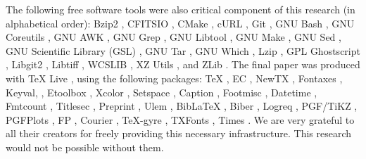 \documentclass[10pt, twocolumn]{article}
\begin{document}
The following free software tools were also critical component of this
research (in alphabetical order): Bzip2 \bziptwoversion, CFITSIO
\cfitsioversion, CMake \cmakeversion, cURL \curlversion, Git \gitversion,
GNU Bash \bashversion, GNU Coreutils \coreutilsversion, GNU AWK
\gawkversion, GNU Grep \grepversion, GNU Libtool \libtoolversion, GNU Make
\makeversion, GNU Sed \sedversion, GNU Scientific Library (GSL)
\gslversion, GNU Tar \tarversion, GNU Which \whichversion, Lzip
\lzipversion, GPL Ghostscript \ghostscriptversion, Libgit2
\libgitwoversion, Libtiff \libtiffversion, WCSLIB \wcslibversion, XZ Utils
\xzversion, and ZLib \zlibversion. The final paper was produced with \TeX{}
Live \texliveversion, using the following packages: \TeX{} \textexversion,
EC \texecversion, NewTX \texnewtxversion, Fontaxes \texfontaxesversion,
Keyval, \texxkeyvalversion, Etoolbox \texetoolboxversion, Xcolor
\texxcolorversion, Setspace \texsetspaceversion, Caption
\texcaptionversion, Footmisc \texfootmiscversion, Datetime
\texdatetimeversion, Fmtcount \texfmtcountversion, Titlesec
\textitlesecversion, Preprint \texpreprintversion, Ulem \texulemversion,
Bib\LaTeX{} \texbiblatexversion, Biber \texbiberversion, Logreq
\texlogreqversion, PGF/TiKZ \texpgfversion, PGFPlots \texpgfplotsversion,
FP \texfpversion, Courier \texcourierversion, \TeX-gyre \textexgyreversion,
TXFonts \textxfontsversion, Times \textimesversion. We are very grateful to
all their creators for freely providing this necessary infrastructure. This
research would not be possible without them.

\printbibliography

\end{document}
